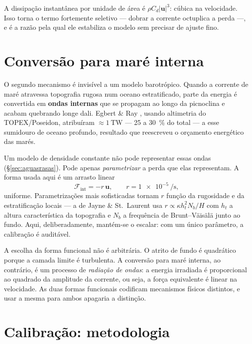 \documentclass[11pt,a4paper,oneside]{report}
\theoremstyle{definition}
\theoremstyle{plain}
\theoremstyle{remark}
\newcommand{\vect}[1]{\bm{#1}}
\begin{document}
A dissipação instantânea por unidade de área é $\rho C_d|\vect{u}|^{3}$: cúbica
na velocidade. Isso torna o termo fortemente seletivo — dobrar a corrente
octuplica a perda —, e é a razão pela qual ele estabiliza o modelo sem precisar
de ajuste fino.

\section{Conversão para maré interna}

O segundo mecanismo é invisível a um modelo barotrópico. Quando a corrente de
maré atravessa topografia rugosa num oceano estratificado, parte da energia é
convertida em \textbf{ondas internas} que se propagam ao longo da picnoclina e
acabam quebrando longe dali. Egbert \& Ray \cite{egbert2000}, usando altimetria
do TOPEX/Poseidon, atribuíram $\approx\SI{1}{\tera\watt}$ — 25 a
\SI{30}{\percent} do total — a esse sumidouro de oceano profundo, resultado que
reescreveu o orçamento energético das marés.

Um modelo de densidade constante não pode representar essas ondas
(\S\ref{sec:aguasrasas}). Pode apenas \emph{parametrizar} a perda que elas
representam. A forma usada aqui é um arrasto linear
\begin{equation}
\vect{\mathcal{F}}_{\text{int}}=-r\,\vect{u},
\qquad r=\SI{1e-5}{\per\second},
\label{eq:arrastolinear}
\end{equation}
uniforme. Parametrizações mais sofisticadas tornam $r$ função da rugosidade e
da estratificação locais — a de Jayne \& St.~Laurent \cite{jayne2001} usa
$r\propto\kappa h_t^{2}N_b/H$ com $h_t$ a altura característica da topografia e
$N_b$ a frequência de Brunt--Väisälä junto ao fundo. Aqui, deliberadamente,
mantém-se o escalar: com um único parâmetro, a calibração é auditável.

\begin{caixa}
A escolha da forma funcional não é arbitrária. O atrito de fundo é quadrático
porque a camada limite é turbulenta. A conversão para maré interna, ao
contrário, é um processo de \emph{radiação de ondas}: a energia irradiada é
proporcional ao quadrado da amplitude da corrente, ou seja, a força equivalente
é linear na velocidade. As duas formas funcionais codificam mecanismos físicos
distintos, e usar a mesma para ambos apagaria a distinção.
\end{caixa}

\section{Calibração: metodologia}
\label{sec:calibracao}
\end{document}
